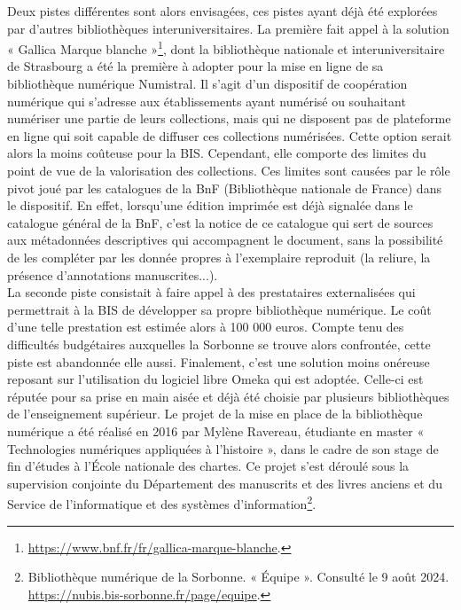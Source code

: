 \documentclass[a4paper,12pt,twoside]{book}
\begin{document}
Deux pistes différentes sont alors envisagées, ces pistes ayant déjà été explorées par d'autres bibliothèques interuniversitaires. La première fait appel à la solution « Gallica Marque blanche »\footnote{
	\url{https://www.bnf.fr/fr/gallica-marque-blanche}.}, dont la bibliothèque nationale et interuniversitaire de Strasbourg a été la première à adopter pour la mise en ligne de sa bibliothèque numérique Numistral. Il s'agit d'un dispositif de coopération numérique qui s’adresse aux établissements ayant numérisé ou souhaitant numériser une partie de leurs collections, mais qui ne disposent pas de plateforme en ligne qui soit capable de diffuser ces collections numérisées. Cette option serait alors la moins coûteuse pour la BIS. Cependant, elle comporte des limites du point de vue de la valorisation des collections. Ces limites sont causées par le rôle pivot joué par les catalogues de la BnF (Bibliothèque nationale de France) dans le dispositif. En effet, lorsqu'une édition imprimée est déjà signalée dans le catalogue général de la BnF, c'est la notice de ce catalogue qui sert de sources aux métadonnées descriptives qui accompagnent le document, sans la possibilité de les compléter par les donnée propres à l'exemplaire reproduit (la reliure, la présence d'annotations manuscrites...).
 \\
 
 La seconde piste consistait à faire appel à des prestataires externalisées qui permettrait à la BIS de développer sa propre bibliothèque numérique. Le coût d'une telle prestation est estimée alors à 100 000 euros. Compte tenu des difficultés budgétaires auxquelles la Sorbonne se trouve alors confrontée, cette piste est abandonnée elle aussi. Finalement, c'est une solution moins onéreuse reposant sur l'utilisation du logiciel libre Omeka qui est adoptée. Celle-ci est réputée pour sa prise en main aisée et déjà été choisie par plusieurs bibliothèques de l'enseignement supérieur. Le projet de la mise en place de la bibliothèque numérique a été réalisé en
2016 par Mylène Ravereau, étudiante en master « Technologies numériques
appliquées à l'histoire », dans le cadre de son stage de fin d'études à
l'École nationale des chartes. Ce projet s'est déroulé
sous la supervision conjointe du Département des manuscrits et des
livres anciens et du Service de l'informatique et des systèmes
d'information\footnote{Bibliothèque numérique de la
	Sorbonne. « Équipe ». Consulté le 9 août 2024.
	\url{https://nubis.bis-sorbonne.fr/page/equipe}.}. \\ 
\end{document}
